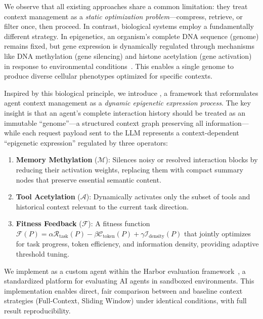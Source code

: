 We observe that all existing approaches share a common limitation: they treat context management as a \textit{static optimization problem}---compress, retrieve, or filter once, then proceed. In contrast, biological systems employ a fundamentally different strategy. In epigenetics, an organism's complete DNA sequence (genome) remains fixed, but gene expression is dynamically regulated through mechanisms like DNA methylation (gene silencing) and histone acetylation (gene activation) in response to environmental conditions~\citep{allis2015epigenetics}. This enables a single genome to produce diverse cellular phenotypes optimized for specific contexts.

Inspired by this biological principle, we introduce \EpiContext, a framework that reformulates agent context management as a \textit{dynamic epigenetic expression process}. The key insight is that an agent's complete interaction history should be treated as an immutable ``genome''---a structured context graph preserving all information---while each request payload sent to the LLM represents a context-dependent ``epigenetic expression'' regulated by three operators:

\begin{enumerate}
    \item \textbf{Memory Methylation} ($\mathcal{M}$): Silences noisy or resolved interaction blocks by reducing their activation weights, replacing them with compact summary nodes that preserve essential semantic content.
    \item \textbf{Tool Acetylation} ($\mathcal{A}$): Dynamically activates only the subset of tools and historical context relevant to the current task direction.
    \item \textbf{Fitness Feedback} ($\mathcal{F}$): A fitness function $\mathcal{F}(P) = \alpha \mathcal{R}_{\text{task}}(P) - \beta \mathcal{C}_{\text{token}}(P) + \gamma \mathcal{I}_{\text{density}}(P)$ that jointly optimizes for task progress, token efficiency, and information density, providing adaptive threshold tuning.
\end{enumerate}

We implement \EpiContext{} as a custom agent within the Harbor evaluation framework~\citep{harbor2026}, a standardized platform for evaluating AI agents in sandboxed environments. This implementation enables direct, fair comparison between \EpiContext{} and baseline context strategies (Full-Context, Sliding Window) under identical conditions, with full result reproducibility.

